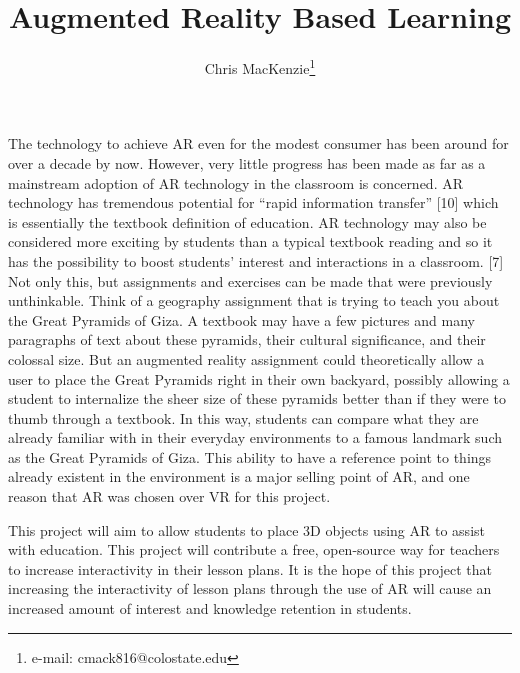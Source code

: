\documentclass{vgtc}                          %
\title{Augmented Reality Based Learning}
\author{Chris MacKenzie\thanks{e-mail: cmack816@colostate.edu}}
\affiliation{\scriptsize CS464}
\begin{document}


\maketitle

    
\indent The technology to achieve AR even for the modest consumer has been around for over a decade by now. However, very little progress has been made as far as a mainstream adoption of AR technology in the classroom is concerned. AR technology has tremendous potential for “rapid information transfer” [10] which is essentially the textbook definition of education. AR technology may also be considered more exciting by students than a typical textbook reading and so it has the possibility to boost students’ interest and interactions in a classroom. [7] Not only this, but assignments and exercises can be made that were previously unthinkable. Think of a geography assignment that is trying to teach you about the Great Pyramids of Giza. A textbook may have a few pictures and many paragraphs of text about these pyramids, their cultural significance, and their colossal size. But an augmented reality assignment could theoretically allow a user to place the Great Pyramids right in their own backyard, possibly allowing a student to internalize the sheer size of these pyramids better than if they were to thumb through a textbook. In this way, students can compare what they are already familiar with in their everyday environments to a famous landmark such as the Great Pyramids of Giza. This ability to have a reference point to things already existent in the environment is a major selling point of AR, and one reason that AR was chosen over VR for this project. 
\vspace*{4mm}

This project will aim to allow students to place 3D objects using AR to assist with education. This project will contribute a free, open-source way for teachers to increase interactivity in their lesson plans. It is the hope of this project that increasing the interactivity of lesson plans through the use of AR will cause an increased amount of interest and knowledge retention in students. 
\end{document}
